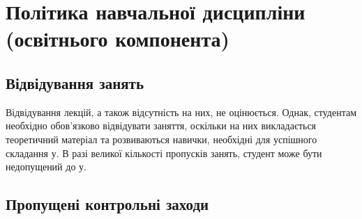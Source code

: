 \documentclass{Syllabus}
\begin{document}
%



\section{Політика навчальної дисципліни (освітнього компонента)}


\subsection*{Відвідування занять}
Відвідування лекцій, а також відсутність на них, не оцінюється. Однак, студентам необхідно обов'язково відвідувати заняття, оскільки на них викладається теоретичний матеріал та розвиваються навички, необхідні для успішного складання \control у. В разі великої кількості пропусків занять, студент може бути недопущений до \control у.

\subsection*{Пропущені контрольні заходи}
\end{document}
